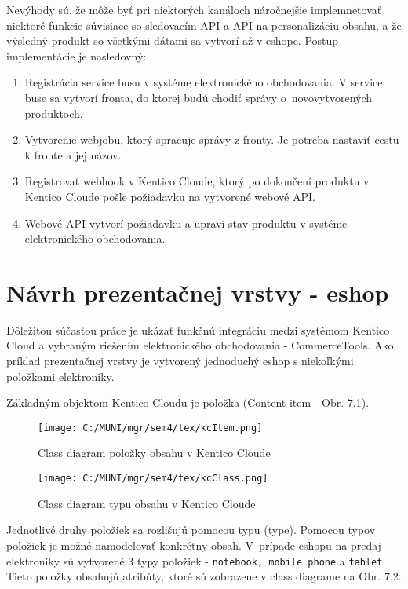 \documentclass[
  printed, %
  table,   %
  lof,     %
  nolot,     %
  twoside,  
]{fithesis3}
\begin{document}
Nevýhody sú, že môže byť pri niektorých kanáloch náročnejšie implemnetovať niektoré funkcie súvisiace so sledovacím API a API na personalizáciu obsahu, a že výsledný produkt so všetkými dátami sa vytvorí až v eshope.
Postup implementácie je nasledovný:
\begin{enumerate}
	\item Registrácia service busu v systéme elektronického obchodovania. V service buse sa vytvorí fronta, do ktorej budú chodiť správy o~novovytvorených produktoch.
	\item Vytvorenie webjobu, ktorý spracuje správy z fronty. Je potreba nastaviť cestu k fronte a jej názov.
	\item Registrovať webhook v Kentico Cloude, ktorý po dokončení produktu v Kentico Cloude pošle požiadavku na vytvorené webové API.
	\item Webové API vytvorí požiadavku a upraví stav produktu v systéme elektronického obchodovania.
\end{enumerate}

\chapter{Návrh prezentačnej vrstvy - eshop}
Dôležitou súčasťou práce je ukázať funkčnú integráciu medzi systémom Kentico Cloud a vybraným riešením elektronického obchodovania - CommerceTools. Ako príklad prezentačnej vrstvy je vytvorený jednoduchý eshop s niekoľkými položkami elektroniky. 

Základným objektom Kentico Cloudu je položka (Content item - Obr. 7.1).

\begin{figure}[h]
  \begin{center}
        \texttt{[image: C:/MUNI/mgr/sem4/tex/kcItem.png]}
  \end{center}
  \caption{Class diagram položky obsahu v Kentico Cloude}
  \label{fig:kentico item}
\end{figure}
\begin{figure}[h]
  \begin{center}
        \texttt{[image: C:/MUNI/mgr/sem4/tex/kcClass.png]}
  \end{center}
  \caption{Class diagram typu obsahu v Kentico Cloude}
  \label{fig:kentico class}
\end{figure}

Jednotlivé druhy položiek sa rozlišujú pomocou typu (type). Pomocou typov položiek je možné namodelovať konkrétny obsah. V~prípade eshopu na predaj elektroniky sú vytvorené 3 typy položiek - \texttt{notebook, mobile phone} a \texttt{tablet}. Tieto položky obsahujú atribúty, ktoré sú zobrazene v class diagrame na Obr. 7.2. 
\end{document}
